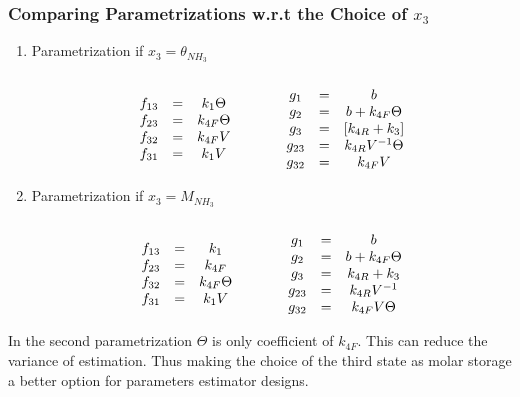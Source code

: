 \subsubsection{Comparing Parametrizations w.r.t the Choice of $x_3$}
\begin{enumerate}
    \item  Parametrization if $x_3 = \theta_{NH_3}$
 \begin{align*}
    \begin{matrix} 
    \\f_{13} &=& k_1 \Theta
    \\f_{23} &=& k_{4F} \Theta
    \\f_{32} &=& k_{4F} V
    \\f_{31} &=& k_1 V
     \end{matrix}
    \qquad \qquad
    \begin{matrix} 
    \\ g_1    &=& b
    \\ g_2    &=& b + k_{4F} \Theta
    \\ g_{3}  &=& [k_{4R}+k_3]
    \\ g_{23} &=& k_{4R} V^{-1} \Theta
    \\ g_{32} &=& k_{4F} V
     \end{matrix}
\end{align*}

\item Parametrization if $x_3 = M_{NH_3}$
\begin{align*}
    \begin{matrix} 
    \\f_{13} &=& k_1
    \\f_{23} &=& k_{4F}
    \\f_{32} &=& k_{4F} \Theta
    \\f_{31} &=& k_1 V
     \end{matrix}
    \qquad \qquad
    \begin{matrix} 
    \\ g_1    &=& b
    \\ g_2    &=& b + k_{4F} \Theta
    \\ g_{3}  &=& k_{4R}+k_3
    \\ g_{23} &=& k_{4R} V^{-1}
    \\ g_{32} &=& k_{4F} V \Theta
     \end{matrix}
\end{align*}
\end{enumerate}

In the second parametrization $\Theta$ is only coefficient of $k_{4F}$. This can
reduce the variance of estimation. Thus making the choice of the third state as
molar storage a better option for parameters estimator designs.







